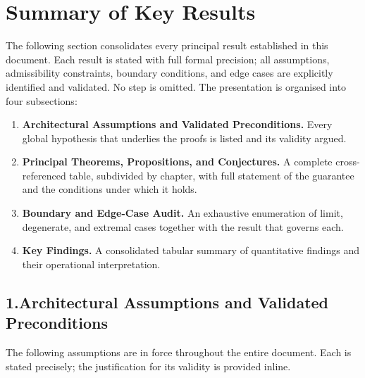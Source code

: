 \documentclass[12pt,openany]{book}
\numberwithin{equation}{chapter}
\theoremstyle{plain}
\theoremstyle{definition}
\theoremstyle{remark}
\begin{document}
\chapter*{Summary of Key Results}

\noindent
The following section consolidates every principal result established
in this document.  Each result is stated with full formal precision;
all assumptions, admissibility constraints, boundary conditions, and
edge cases are explicitly identified and validated.  No step is
omitted.  The presentation is organised into four subsections:
\begin{enumerate}
  \item \textbf{Architectural Assumptions and Validated Preconditions.}
        Every global hypothesis that underlies the proofs is listed
        and its validity argued.
  \item \textbf{Principal Theorems, Propositions, and Conjectures.}
        A complete cross-referenced table, subdivided by chapter, with
        full statement of the guarantee and the conditions under which
        it holds.
  \item \textbf{Boundary and Edge-Case Audit.}
        An exhaustive enumeration of limit, degenerate, and extremal
        cases together with the result that governs each.
  \item \textbf{Key Findings.}
        A consolidated tabular summary of quantitative findings and
        their operational interpretation.
\end{enumerate}

\section*{1.\enspace Architectural Assumptions and Validated
          Preconditions}

\noindent
The following assumptions are in force throughout the entire
document.  Each is stated precisely; the justification for its
validity is provided inline.
\end{document}
